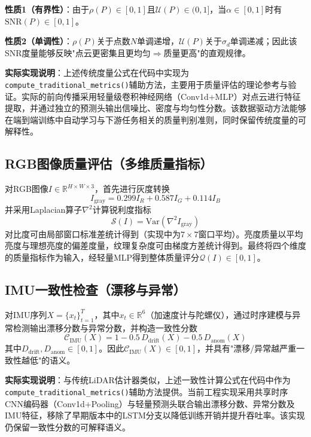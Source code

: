 \textbf{性质1（有界性）}：由于$\rho(P)\in[0,1]$且$\mathcal{U}(P)\in(0,1]$，当$\alpha\in[0,1]$时有$\mathrm{SNR}(P)\in[0,1]$。

\textbf{性质2（单调性）}：$\rho(P)$关于点数$N$单调递增，$\mathcal{U}(P)$关于$\sigma_d$单调递减；因此该SNR度量能够反映"点云更密集且更均匀$\Rightarrow$质量更高"的直观规律。

\textbf{实际实现说明}：上述传统度量公式在代码中实现为\texttt{compute\_traditional\_metrics()}辅助方法，主要用于质量评估的理论参考与验证。实际的前向传播采用轻量级卷积神经网络（Conv1d+MLP）对点云进行特征提取，并通过独立的预测头输出信噪比、密度与均匀性分数。该数据驱动方法能够在端到端训练中自动学习与下游任务相关的质量判别准则，同时保留传统度量的可解释性。

\subsection{RGB图像质量评估（多维质量指标）}
对RGB图像$I\in\mathbb{R}^{H\times W\times 3}$，首先进行灰度转换
\begin{equation}
    I_{\text{gray}}=0.299 I_R + 0.587 I_G + 0.114 I_B
\end{equation}
并采用Laplacian算子$\nabla^2$计算锐利度指标
\begin{equation}
    \mathcal{S}(I)=\mathrm{Var}(\nabla^2 I_{\text{gray}})
\end{equation}
对比度可由局部窗口标准差统计得到（实现中为$7\times 7$窗口平均）。亮度质量以平均亮度与理想亮度的偏差度量，纹理复杂度可由梯度方差统计得到。最终将四个维度的质量指标作为输入，经轻量MLP得到整体质量评分$\mathcal{Q}(I)\in[0,1]$。

\subsection{IMU一致性检查（漂移与异常）}
对IMU序列$X=\{x_t\}_{t=1}^{T}$，其中$x_t\in\mathbb{R}^{6}$（加速度计与陀螺仪），通过时序建模与异常检测输出漂移分数与异常分数，并构造一致性分数
\begin{equation}
    \mathcal{C}_{\text{IMU}}(X)=1-0.5\,D_{\text{drift}}(X)-0.5\,D_{\text{anom}}(X)
\end{equation}
其中$D_{\text{drift}},D_{\text{anom}}\in[0,1]$。因此$\mathcal{C}_{\text{IMU}}(X)\in[0,1]$，并具有"漂移/异常越严重一致性越低"的语义。

\textbf{实际实现说明}：与传统LiDAR估计器类似，上述一致性计算公式在代码中作为\texttt{compute\_traditional\_metrics()}辅助方法提供。当前工程实现采用共享时序CNN编码器（Conv1d+Pooling）与轻量预测头联合输出漂移分数、异常分数及IMU特征，移除了早期版本中的LSTM分支以降低训练开销并提升吞吐率。该实现仍保留一致性分数的可解释语义。

